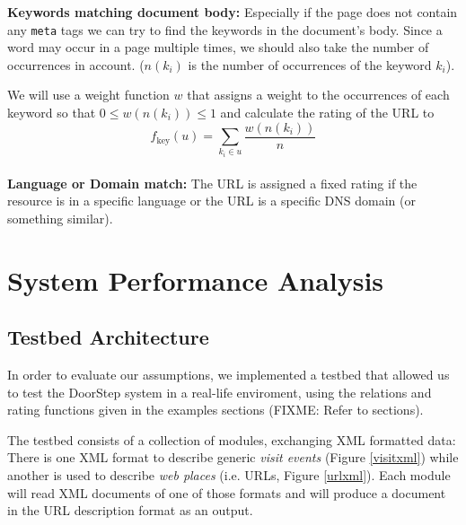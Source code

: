 \documentclass[a4paper]{danarticle}
\theoremstyle{remark}
\begin{document}
    \textbf{Keywords matching document body:} Especially if the page does not
    contain any \verb$meta$ tags we can try to find the keywords in the
    document's body. Since a word may occur in a page multiple times, we should
    also take the number of occurrences in account. ($ n(k_i) $ is the number of
    occurrences of the keyword $ k_i $).
    
    We will use a weight function $ w $ that assigns a weight to the occurrences
    of each keyword so that $ 0 \leq w(n(k_i)) \leq 1 $ and calculate the
    rating of the URL to
    \[
      f_{\mbox{key}}(u) = \sum_{k_i \in u} \frac{w(n(k_i))}{n}
    \]
    \\
    
    \textbf{Language or Domain match:} The URL is assigned a fixed
    rating if the resource is in a specific language or the URL is a
    specific DNS domain (or something similar).
  \section{System Performance Analysis}
    \subsection{Testbed Architecture}
      In order to evaluate our assumptions, we implemented a testbed that 
      allowed us to test the DoorStep system in a real-life enviroment, using 
      the relations and rating functions given in the examples sections (FIXME: 
      Refer to sections).
      
      The testbed consists of a collection of modules, exchanging XML formatted 
      data: There is one XML format to describe generic \textit{visit events} 
      (Figure \ref{visitxml}) while another is used to describe \textit{web 
      places} (i.e. URLs, Figure \ref{urlxml}). Each module will read XML 
      documents of one of those formats and will produce a document in the URL 
      description format as an output.
      
\end{document}
